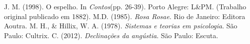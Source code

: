\begin{multicols}{2}
\begin{scieloReferencesContainer}[Referências]
\allowbreak{} J.\allowbreak{} M.\allowbreak{} (\allowbreak{}1998)\allowbreak{}.\allowbreak{} O espelho.\allowbreak{} In \textit{Contos}(\allowbreak{}pp.\allowbreak{} 26-\allowbreak{}39)\allowbreak{}.\allowbreak{} Porto Alegre:\allowbreak{} L\&\allowbreak{\allowbreak{}\allowbreak{}}\allowbreak{}PM.\allowbreak{} (\allowbreak{}Trabalho original publicado em 1882)\allowbreak{}.\allowbreak{}
\allowbreak{} M.\allowbreak{}D.\allowbreak{} (\allowbreak{}1985)\allowbreak{}.\allowbreak{} \textit{Rosa Rosae}.\allowbreak{} Rio de Janeiro:\allowbreak{} Editora Aoutra.\allowbreak{}
\allowbreak{} M.\allowbreak{} H.\allowbreak{},\allowbreak{} \&\allowbreak{\allowbreak{}\allowbreak{}}\allowbreak{} Hillix,\allowbreak{} W.\allowbreak{} A.\allowbreak{} (\allowbreak{}1978)\allowbreak{}.\allowbreak{} \textit{Sistemas e teorias em psicologia}.\allowbreak{} São Paulo:\allowbreak{} Cultrix.\allowbreak{}
\allowbreak{} C.\allowbreak{} (\allowbreak{}2012)\allowbreak{}.\allowbreak{} \textit{Declinações da angústia}.\allowbreak{} São Paulo:\allowbreak{} Escuta.\allowbreak{}
\end{scieloReferencesContainer}

\end{multicols}


